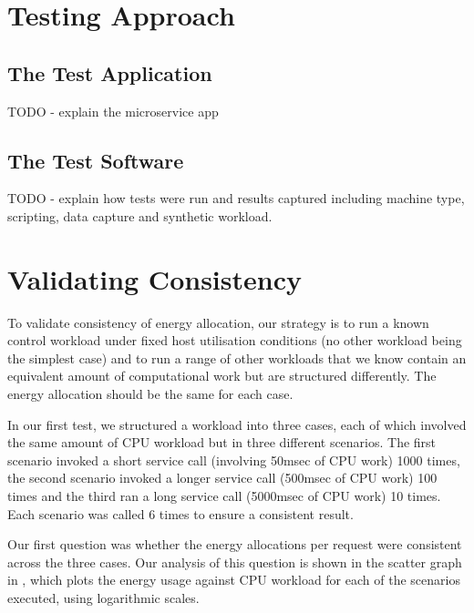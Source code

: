 \section{Testing Approach}

\subsection{The Test Application}
TODO - explain the microservice app

\subsection{The Test Software}
TODO - explain how tests were run and results captured including machine type, scripting, data capture and synthetic workload.

\section{Validating Consistency}

To validate consistency of energy allocation, our strategy is to run a known control workload under fixed host utilisation conditions (no other workload being the simplest case) and to run a range of other workloads that we know contain an equivalent amount of computational work but are structured differently.  The energy allocation should be the same for each case.

In our first test, we structured a workload into three cases, each of which involved the same amount of CPU workload but in three different scenarios.  The first scenario invoked a short service call (involving 50msec of CPU work) 1000 times, the second scenario invoked a longer service call (500msec of CPU work) 100 times and the third ran a long service call (5000msec of CPU work) 10 times.  Each scenario was called 6 times to ensure a consistent result.

Our first question was whether the energy allocations per request were consistent across the three cases.  Our analysis of this question is shown in the scatter graph in , which plots the energy usage against CPU workload for each of the scenarios executed, using logarithmic scales.

